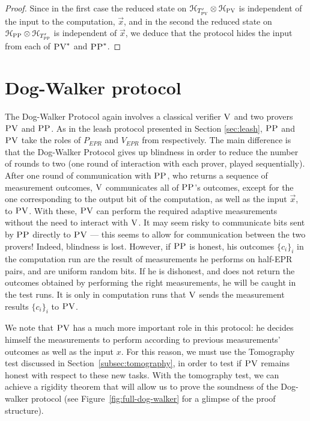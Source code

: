 \begin{proof}
Since in the first case the reduced state on $\mathcal{H}_{T'_{\textsc{PV}}} \otimes \mathcal{H}_{\textsc{PV}}$ is independent of the input to the computation, $\vec{x}$, and in the second  the reduced state on $ \mathcal{H}_{\textsc{PP}}\otimes \mathcal{H}_{T'_{\textsc{PP}}} $ is independent of $\vec{x}$, we deduce that the protocol hides the input from each of $\textsc{PV}^*$ and $\textsc{PP}^*$. 
\end{proof}



\section{Dog-Walker protocol}
\label{sec:dog-walker}
The Dog-Walker Protocol again involves a classical verifier $\textsc{V}$ and two provers $\textsc{PV}$ and $\textsc{PP}$. As in the leash protocol presented in Section \ref{sec:leash}, $\textsc{PP}$ and $\textsc{PV}$ take the roles of $P_{EPR}$ and $V_{EPR}$ from \cite{broadbent15howtoverify} respectively. 
The main difference is that the Dog-Walker Protocol gives up blindness in order to reduce the number of rounds to two (one round of interaction with each prover, played sequentially). After 
one
round of communication with $\textsc{PP}$, who returns a sequence of measurement outcomes, %
$\textsc{V}$ communicates all of $\textsc{PP}$'s outcomes, except for the one corresponding to the output bit of the computation, as well as the input 
$\vec{x}$,
to $\textsc{PV}$.  
With 
these, $\textsc{PV}$ can perform the required adaptive measurements without the need to interact with 
$\textsc{V}$.
It may seem %
risky to communicate bits sent by $\textsc{PP}$ directly to $\textsc{PV}$ --- this seems to allow for communication between the two provers! Indeed, blindness is lost. However, if $\textsc{PP}$ is honest, his outcomes $\{c_i\}_i$ in the computation run are the result of measurements he performs on half-EPR pairs, and are uniform random bits. If he is dishonest, and does not return the outcomes  obtained by performing the right measurements, he will be caught in the test runs. It is only in computation runs that $\textsc{V}$ sends the measurement results $\{c_i\}_i$ to $\textsc{PV}$. 

We note that $\textsc{PV}$ has a much more important role in this protocol: he
decides himself the measurements to perform according to previous measurements'
outcomes as well as the input $x$. For this reason, we must use the Tomography test
discussed in Section~\ref{subsec:tomography}, in order to test if $\textsc{PV}$ remains
honest with respect to these new tasks.  With the tomography test, we can achieve a
rigidity theorem that will allow us to prove the soundness of the Dog-walker
protocol
(see Figure~\ref{fig:full-dog-walker} for a glimpse of the proof
structure).


